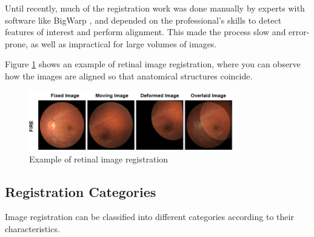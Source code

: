 Until recently, much of the registration work was done manually by experts with software like BigWarp \cite{bigwarp},
and depended on the professional's skills to detect features of interest and perform alignment.
This made the process slow and error-prone, as well as impractical for large volumes of images.

Figure \ref{fig:retin_reg} shows an example of retinal image registration, where you can observe how the images are aligned so that anatomical structures coincide.

\begin{figure}[tbp]
    \centering
    \includegraphics[width=0.8\textwidth]{imaxes/retin-reg.png}
    \caption{Example of retinal image registration \cite{sivaraman2024retinaregnetzeroshotapproachretinal}}
    \label{fig:retin_reg}
\end{figure}

\subsection{Registration Categories}\label{subsec:Registration categories}

Image registration can be classified into different categories according to their characteristics.

